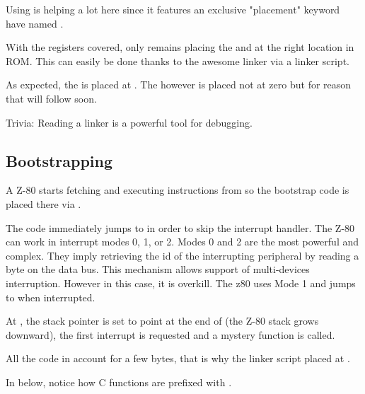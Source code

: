 Using  is helping a lot here since it features an exclusive "placement" keyword have named .



With the registers covered, only remains placing the  and  at the right location in ROM. This can easily be done thanks to the awesome  linker via a linker script.



As expected, the  is placed at . The  however is placed not at zero but  for reason that will follow soon.

\begin{trivia}
Trivia: Reading a linker  is a powerful tool for debugging.
\end{trivia}

\subsection{Bootstrapping}
A Z-80 starts fetching and executing instructions from  so the bootstrap code  is placed there via .

The code immediately jumps to  in order to skip the interrupt handler. The Z-80 can work in interrupt modes 0, 1, or 2. Modes 0 and 2 are the most powerful and complex. They imply retrieving the id of the interrupting peripheral by reading a byte on the data bus. This mechanism allows support of multi-devices interruption. However in this case, it is overkill. The z80 uses Mode 1 and jumps to  when interrupted.

At , the stack pointer  is set to point at the end of  (the Z-80 stack grows downward), the first interrupt is requested and a mystery  function is called.

All the code in  account for a few bytes, that is why the linker script placed  at .

In  below, notice how C functions are prefixed with \icode{\_}.










